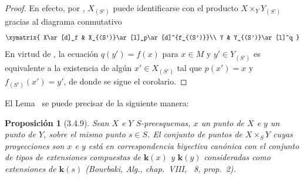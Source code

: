 \documentclass[oneside]{amsart}
\theoremstyle{ega-env-style}
\theoremstyle{ega-thm-env-style}
\newtheorem*{proposition}{Proposición}
\theoremstyle{ega-defn-env-style}
\newcommand{\oldpage}[2][]{{\marginnote{\normalfont{\textbf{#1}~|~#2}}}\ignorespaces}
\let\EGAOriginalLabel\label
\renewcommand{\label}[1]{\phantomsection\EGAOriginalLabel{#1}}
\begin{document}
\oldpage[I]{114}
\begin{proof}
En efecto, por , $X_{(S')}$ puede identificarse con el producto $X\times_Y Y_{(S')}$ gracias al diagrama conmutativo
\label{I.3.4.8.proof-diagram-fr}
\[
  \xymatrix{
    X\ar[d]_f & X_{(S')}\ar[l]_p\ar[d]^{f_{(S')}}\\
    Y & Y_{(S')}\ar[l]^q
  }
\]
En virtud de , la ecuación $q(y')=f(x)$ para $x\in M$ y $y'\in Y_{(S')}$ es equivalente a la existencia de algún $x'\in X_{(S')}$ tal que $p(x')=x$ y $f_{(S')}(x')=y'$, de donde se sigue el corolario.
\end{proof}

El Lema~ se puede precisar de la siguiente manera:
\begin{proposition}[3.4.9]
\label{I.3.4.9}
Sean $X$ e $Y$ $S$-preesquemas, $x$ un punto de $X$ e $y$ un punto de $Y$, sobre el mismo punto $s\in S$.
El conjunto de puntos de $X\times_S Y$ cuyas proyecciones son $x$ e $y$ está en correspondencia biyectiva canónica con el conjunto de tipos de extensiones compuestas de $\boldsymbol{k}(x)$ y $\boldsymbol{k}(y)$ consideradas como extensiones de $\boldsymbol{k}(s)$ \textup{(Bourbaki, \emph{Alg.}, chap.~VIII, \textsection~8, prop.~2)}.
\end{proposition}
\end{document}
